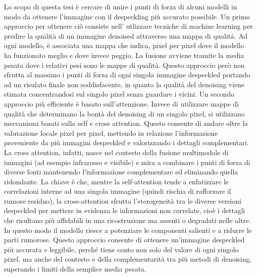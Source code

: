 Lo scopo di questa tesi è cercare di unire i punti di forza di alcuni modelli in modo da ottenere l’immagine
con il despeckling più accurato possibile. Un primo approccio per ottenere ciò consiste nell' utlizzare tecniche di machine learning
per predire la qualità di un immagine denoised attraverso una mappa di qualità. Ad ogni modello,
è associata una mappa che indica, pixel per pixel dove il modello ha funzionato meglio e 
dove invece peggio. La fusione avviene tramite la media pesata dove i relativi pesi 
sono le mappe di qualità. Questo approccio però non sfrutta al massimo i punti di forza 
di ogni singola immagine despeckled portando ad un risulato finale non soddisfacente, 
in quanto la qualità del denoising viene stimata concentrandosi sul singolo pixel senza 
guardare i vicini. Un secondo approccio più efficiente è basato sull’attenzione. Invece 
di utilizzare mappe di qualità che determinano la bontà del denoising di un singolo 
pixel, si utilizzano meccanismi basati sulla self e cross attention. Questo consente di andare oltre 
la valutazione locale pixel per pixel, mettendo in relazione l’informazione proveniente 
da più immagini despeckled e valorizzando i dettagli complementari.
La cross attention, infatti, nasce nel contesto della fusione multimodale di immagini 
(ad esempio infrarosso e visibile) e mira a combinare i punti di forza di diverse fonti 
mantenendo l’informazione complementare ed eliminando quella ridondante.
La chiave è che, mentre la self-attention tende a enfatizzare le correlazioni interne ad 
una singola immagine (quindi rischia di rafforzare il rumore residuo), la cross-attention 
sfrutta l’eterogeneità tra le diverse versioni despeckled per mettere in evidenza le 
informazioni non correlate, cioè i dettagli che risultano più affidabili in una ricostruzione 
ma assenti o degradati nelle altre. In questo modo il modello riesce a potenziare le componenti 
salienti e a ridurre le parti rumorose. Questo approccio consente di ottenere un’immagine despeckled più accurata e leggibile, perché 
tiene conto non solo del valore di ogni singolo pixel, ma anche del contesto e della complementarità 
tra più metodi di denoising, superando i limiti della semplice media pesata.

\medskip

